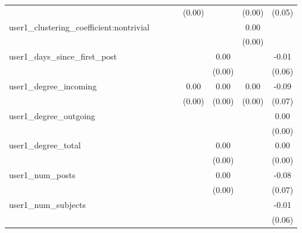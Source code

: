 \begin{table}
\begin{center}
\begin{tabular}{lccccccc}
                                               &          &            &         & (0.00)  &          & (0.00)             & (0.05)   \\
user1_clustering_coefficient:nontrivial        &          &            &         &         &          & 0.00               &          \\
                                               &          &            &         &         &          & (0.00)             &          \\
user1_days_since_first_post                    &          &            &         &         & 0.00     &                    & -0.01    \\
                                               &          &            &         &         & (0.00)   &                    & (0.06)   \\
user1_degree_incoming                          &          &            &         & 0.00    & 0.00     & 0.00               & -0.09    \\
                                               &          &            &         & (0.00)  & (0.00)   & (0.00)             & (0.07)   \\
user1_degree_outgoing                          &          &            &         &         &          &                    & 0.00     \\
                                               &          &            &         &         &          &                    & (0.00)   \\
user1_degree_total                             &          &            &         &         & 0.00     &                    & 0.00     \\
                                               &          &            &         &         & (0.00)   &                    & (0.00)   \\
user1_num_posts                                &          &            &         &         & 0.00     &                    & -0.08    \\
                                               &          &            &         &         & (0.00)   &                    & (0.07)   \\
user1_num_subjects                             &          &            &         &         &          &                    & -0.01    \\
                                               &          &            &         &         &          &                    & (0.06)   \\

\end{tabular}
\end{center}
\end{table}
